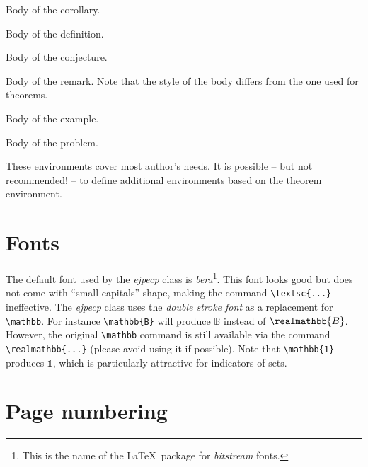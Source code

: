 \documentclass[ECP]{ejpecp} %
\begin{document}
 \begin{corollary}[My corollary]
   Body of the corollary.
 \end{corollary}

 \begin{definition}[My definition]
   Body of the definition.
 \end{definition}

 \begin{conjecture}[My conjecture]
   Body of the conjecture.
 \end{conjecture}

 \begin{remark}[My remark]
   Body of the remark. Note that the style of the body differs from the one
   used for theorems.
 \end{remark}

 \begin{example}[My example]
   Body of the example.
 \end{example}

 \begin{problem}[My problem]
   Body of the problem.
 \end{problem}

 These environments cover most author's needs. It is possible -- but not
 recommended! -- to define additional environments based on the theorem
 environment.

\section{Fonts}

The default font used by the \emph{ejpecp} class is \emph{bera}\footnote{This
  is the name of the \LaTeX\ package for \emph{bitstream} fonts.}. This font
looks good but does not come with ``small capitals'' shape, making the command
\verb+\textsc{...}+ ineffective. The \emph{ejpecp} class uses the \emph{double
  stroke font} as a replacement for \verb+\mathbb+. For instance
\verb+\mathbb{B}+ will produce $\mathbb{B}$ instead of $\realmathbb{B}$.
However, the original \verb+\mathbb+ command is still available via the
command \verb+\realmathbb{...}+ (please avoid using it if possible). Note that
\verb+\mathbb{1}+ produces $\mathbb{1}$, which is particularly attractive for
indicators of sets.

\section{Page numbering}
\end{document}
